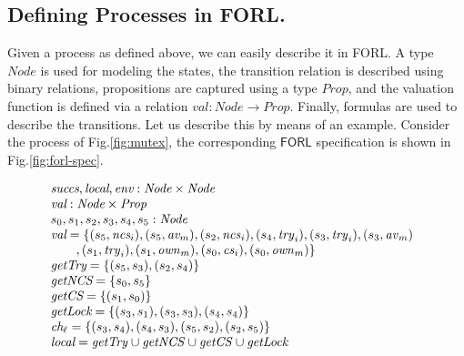 \subsection{Defining Processes in \textsf{FORL}.}
	Given a process as defined above, we can easily describe it in \textsf{FORL}. A type $\mathit{Node}$ is used for modeling the states, the transition relation is described using binary relations, propositions are captured using a type $\mathit{Prop}$, and the valuation function is defined via a relation $\mathit{val}:\mathit{Node} \rightarrow \mathit{Prop}$. Finally, formulas are used to describe the transitions. Let us describe this by means of an example. Consider the process of Fig.\ref{fig:mutex},  the corresponding $\textsf{FORL}$ specification is shown in Fig.\ref{fig:forl-spec}.
\begin{figure}[t!]
$%
\begin{array}{l}
	\textit{succs},\textit{local}, \textit{env}:\textit{Node} \times \textit{Node}\\
	\textit{val}: \textit{Node} \times \mathit{Prop} \\
	s_0,s_1,s_2,s_3,s_4,s_5:\textit{Node}\\
	\textit{val} = \{ (s_5 ,  \textit{ncs}_i), (s_5, \textit{av}_m), (s_2, \mathit{ncs}_i), (s_4, \mathit{try}_i) 
	, (s_3, \mathit{try}_i), (s_3, \mathit{av}_m) \\ 
	\hspace*{0.7cm},  (s_1, \mathit{try}_i), (s_1,\mathit{own}_m),  (s_0, \mathit{cs}_i), (s_0, \mathit{own}_m) \}\\
	\textit{getTry} = \{(s_5, s_3),(s_2, s_4) \}\\
	\textit{getNCS} = \{s_0,s_5 \} \\ 
	\textit{getCS} = \{ (s_1, s_0)\}\\
	\textit{getLock} = \{ (s_3, s_1), (s_3, s_3),(s_4,s_4) \} \\
	\textit{ch}_{\ell} = \{ (s_3, s_4),(s_4, s_3),(s_5,s_2), (s_2,s_5) \}\\
	\textit{local} =  \mathit{getTry} \cup \mathit{getNCS}  \cup \mathit{getCS} \cup \mathit{getLock}\\
\end{array}
$

\end{figure}
